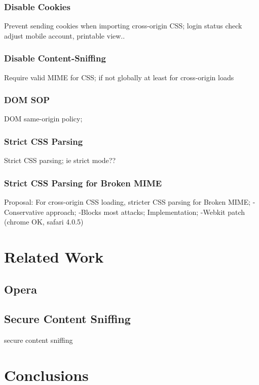 \documentclass{acm_proc_article-sp}
\begin{document}
\subsubsection{Disable Cookies}
Prevent sending cookies when importing cross-origin CSS;
login status check
adjust mobile account, printable view..

\subsubsection{Disable Content-Sniffing}
Require valid MIME for CSS; if not globally at least for cross-origin loads

\subsubsection{DOM SOP}
DOM same-origin policy;

\subsubsection{Strict CSS Parsing}
Strict CSS parsing;
ie strict mode??

\subsubsection{Strict CSS Parsing for Broken MIME}
Proposal: For cross-origin CSS loading, stricter CSS parsing for Broken MIME;
-Conservative approach;
-Blocks most attacks;
Implementation;
-Webkit patch (chrome OK, safari 4.0.5)

\section{Related Work}

\subsection{Opera}

\subsection{Secure Content Sniffing}
secure content sniffing\cite{securecontentsniffing}

\section{Conclusions}




\end{document}
